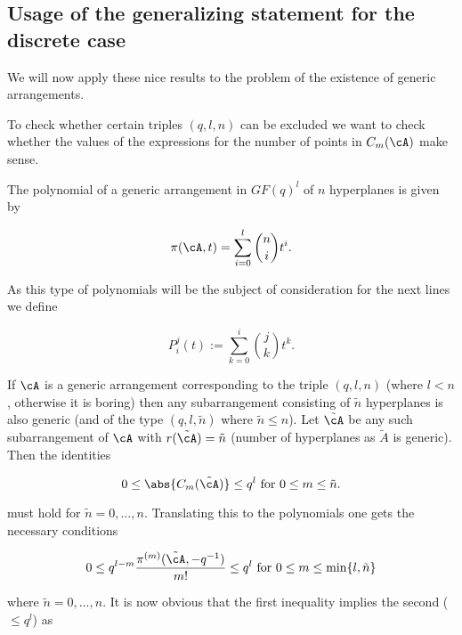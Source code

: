 
\subsection{Usage of the generalizing statement for the discrete case}

We will now apply these nice results to the problem of the existence of generic arrangements.

To check whether certain triples $(q,l,n)$ can be excluded we want to check whether the values of the expressions for the number of points in $C_m(\cA)$ make sense.

The  polynomial of a generic arrangement in $GF(q)^l$ of $n$ hyperplanes is given by

$$
  \pi(\cA,t)=\sum_{i=0}^l{\binom{n}{i}t^i}\text{.}
$$

As this type of polynomials will be the subject of consideration for the next lines we define

$$
  P_i^j(t):=\sum_{k=0}^i{\binom{j}{k}t^k}\text{.}
$$

If $\cA$ is a generic arrangement corresponding to the triple $(q,l,n)$ (where $l<n$, otherwise it is boring) then any subarrangement consisting of $\tilde{n}$ hyperplanes is also generic (and of the type $(q,l,\tilde{n})$ where $\tilde{n}\leq n$). Let $\tilde{\cA}$ be any such subarrangement of $\cA$ with $r(\tilde{\cA})=\tilde{n}$ (number of hyperplanes as $\tilde{A}$ is generic). Then the identities

$$
  0 \leq \abs{C_m(\tilde{\cA})} \leq q^l \text{ for } 0\leq m\leq\tilde{n}\text{.}
$$

must hold for $\tilde{n}=0,\ldots,n$. Translating this to the  polynomials one gets the necessary conditions

\begin{align}
  0\leq q^{l-m}\frac{\pi^{(m)}(\tilde{\cA},-q^{-1})}{m!} \leq q^l \text{ for } 0\leq m\leq\min\{l,\tilde{n}\}
\end{align}

where $\tilde{n}=0,\ldots,n$. It is now obvious that the first inequality implies the second ($\leq q^l$) as

